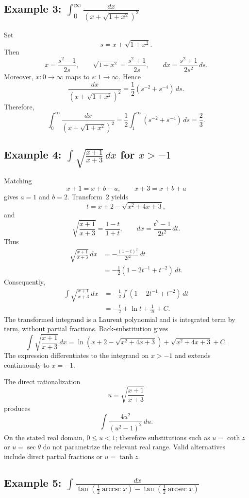 \documentclass[11pt]{article}
\theoremstyle{remark}
\DeclareMathOperator{\arccsc}{arccsc}
\DeclareMathOperator{\arcsec}{arcsec}
\begin{document}
\subsection*{Example 3: $\displaystyle\int_0^\infty\frac{dx}{\left(x+\sqrt{1+x^2}\right)^2}$}

Set
\[
s=x+\sqrt{1+x^2}.
\]
Then
\[
x=\frac{s^2-1}{2s},
\qquad
\sqrt{1+x^2}=\frac{s^2+1}{2s},
\qquad
dx=\frac{s^2+1}{2s^2}\,ds.
\]
Moreover, $x:0\to\infty$ maps to $s:1\to\infty$. Hence
\[
\frac{dx}{\left(x+\sqrt{1+x^2}\right)^2}
=\frac{1}{2}\left(s^{-2}+s^{-4}\right)\,ds.
\]
Therefore,
\[
\int_0^\infty\frac{dx}{\left(x+\sqrt{1+x^2}\right)^2}
=\frac{1}{2}\int_1^\infty\left(s^{-2}+s^{-4}\right)\,ds
=\frac{2}{3}.
\]

\subsection*{Example 4: $\displaystyle\int\sqrt{\frac{x+1}{x+3}}\,dx$ for $x>-1$}

Matching
\[
x+1=x+b-a,
\qquad
x+3=x+b+a
\]
gives $a=1$ and $b=2$. Transform~2 yields
\[
t=x+2-\sqrt{x^2+4x+3},
\]
and
\[
\sqrt{\frac{x+1}{x+3}}=\frac{1-t}{1+t},
\qquad
dx=\frac{t^2-1}{2t^2}\,dt.
\]
Thus
\begin{align*}
\sqrt{\frac{x+1}{x+3}}\,dx
&=-\frac{(1-t)^2}{2t^2}\,dt\\
&=-\frac{1}{2}\left(1-2t^{-1}+t^{-2}\right)\,dt.
\end{align*}
Consequently,
\begin{align*}
\int\sqrt{\frac{x+1}{x+3}}\,dx
&=-\frac{1}{2}\int\left(1-2t^{-1}+t^{-2}\right)\,dt\\
&=-\frac{t}{2}+\ln t+\frac{1}{2t}+C.
\end{align*}
The transformed integrand is a Laurent polynomial and is integrated term by term, without partial fractions. Back-substitution gives
\[
\int\sqrt{\frac{x+1}{x+3}}\,dx
=\ln\!\left(x+2-\sqrt{x^2+4x+3}\right)
+\sqrt{x^2+4x+3}+C.
\]
The expression differentiates to the integrand on $x>-1$ and extends continuously to $x=-1$.

The direct rationalization
\[
u=\sqrt{\frac{x+1}{x+3}}
\]
produces
\[
\int\frac{4u^2}{(u^2-1)^2}\,du.
\]
On the stated real domain, $0\le u<1$; therefore substitutions such as $u=\coth z$ or $u=\sec\theta$ do not parametrize the relevant real range. Valid alternatives include direct partial fractions or $u=\tanh z$.

\subsection*{Example 5: $\displaystyle\int\frac{dx}{\tan\!\left(\frac12\arccsc x\right)-\tan\!\left(\frac12\arcsec x\right)}$}
\end{document}
